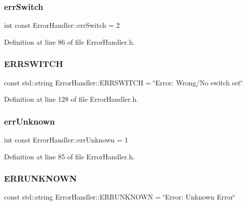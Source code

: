\subsubsection{\texorpdfstring{errSwitch}{errSwitch}}
{\footnotesize\ttfamily int const Error\+Handler\+::err\+Switch = 2\hspace{0.3cm}{\ttfamily [static]}}



Definition at line 86 of file Error\+Handler.\+h.

\mbox{\label{classErrorHandler_a7d2d47caa057173f4a55e92fd62e9fb8}} 
\subsubsection{\texorpdfstring{ERRSWITCH}{ERRSWITCH}}
{\footnotesize\ttfamily const std\+::string Error\+Handler\+::\+E\+R\+R\+S\+W\+I\+T\+CH = \char`\"{}Error\+: Wrong/No switch set\char`\"{}\hspace{0.3cm}{\ttfamily [static]}}



Definition at line 128 of file Error\+Handler.\+h.

\mbox{\label{classErrorHandler_a51e373250da346a49522dfdb99ddc1b3}} 
\subsubsection{\texorpdfstring{errUnknown}{errUnknown}}
{\footnotesize\ttfamily int const Error\+Handler\+::err\+Unknown = 1\hspace{0.3cm}{\ttfamily [static]}}



Definition at line 85 of file Error\+Handler.\+h.

\mbox{\label{classErrorHandler_a9530db091517e099bc9bad620390c31d}} 
\subsubsection{\texorpdfstring{ERRUNKNOWN}{ERRUNKNOWN}}
{\footnotesize\ttfamily const std\+::string Error\+Handler\+::\+E\+R\+R\+U\+N\+K\+N\+O\+WN = \char`\"{}Error\+: Unknown Error\char`\"{}\hspace{0.3cm}{\ttfamily [static]}}



